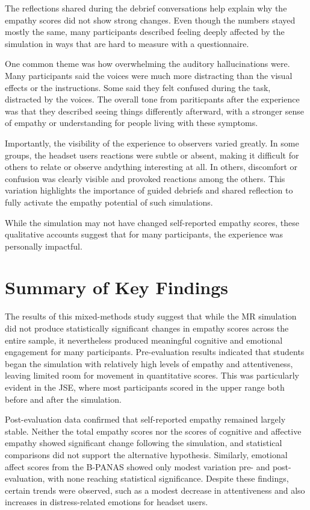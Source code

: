 The reflections shared during the debrief conversations help explain why the empathy scores did not show strong changes. Even though the numbers stayed mostly the same, many participants described feeling deeply affected by the simulation in ways that are hard to measure with a questionnaire.

One common theme was how overwhelming the auditory hallucinations were. Many participants said the voices were much more distracting than the visual effects or the instructions. Some said they felt confused during the task, distracted by the voices. The overall tone from pariticpants after the experience was that they described seeing things differently afterward, with a stronger sense of empathy or understanding for people living with these symptoms.

\vspace{1em}

Importantly, the visibility of the experience to observers varied greatly. In some groups, the headset users reactions were subtle or absent, making it difficult for others to relate or observe andything interesting at all. In others, discomfort or confusion was clearly visible and provoked reactions among the others. This variation highlights the importance of guided debriefs and shared reflection to fully activate the empathy potential of such simulations.

While the simulation may not have changed self-reported empathy scores, these qualitative accounts suggest that for many participants, the experience was personally impactful. 


\section{Summary of Key Findings}

The results of this mixed-methods study suggest that while the MR simulation did not produce statistically significant changes in empathy scores across the entire sample, it nevertheless produced meaningful cognitive and emotional engagement for many participants. Pre-evaluation results indicated that students began the simulation with relatively high levels of empathy and attentiveness, leaving limited room for  movement in quantitative scores. This was particularly evident in the JSE, where most participants scored in the upper range both before and after the simulation.

\vspace{1em}

Post-evaluation data confirmed that self-reported empathy remained largely stable. Neither the total empathy scores nor the scores of cognitive and affective empathy showed significant change following the simulation, and statistical comparisons did not support the alternative hypothesis. Similarly, emotional affect scores from the B-PANAS showed only modest variation pre- and post-evaluation, with none reaching statistical significance. Despite these findings, certain trends were observed, such as a modest decrease in attentiveness and also increases in distress-related emotions for headset users.

